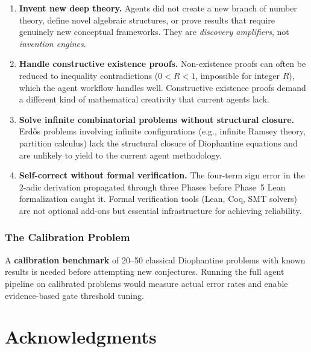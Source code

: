 \documentclass[12pt,a4paper]{article}
\theoremstyle{plain}
\theoremstyle{definition}
\begin{document}
\begin{enumerate}[label=(\arabic*), nosep]
  \item \textbf{Invent new deep theory.}
    Agents did not create a new branch of number theory, define novel
    algebraic structures, or prove results that require genuinely new
    conceptual frameworks.  They are \emph{discovery amplifiers}, not
    \emph{invention engines}.

  \item \textbf{Handle constructive existence proofs.}
    Non-existence proofs can often be reduced to inequality contradictions
    ($0 < R < 1$, impossible for integer $R$), which the agent workflow
    handles well.  Constructive existence proofs demand a different kind of
    mathematical creativity that current agents lack.

  \item \textbf{Solve infinite combinatorial problems without
    structural closure.}
    Erd\H{o}s problems involving infinite configurations (e.g., infinite
    Ramsey theory, partition calculus) lack the structural closure of
    Diophantine equations and are unlikely to yield to the current agent
    methodology.

  \item \textbf{Self-correct without formal verification.}
    The four-term sign error in the $2$-adic derivation propagated
    through three Phases before Phase~5 Lean formalization caught it.
    Formal verification tools (Lean, Coq, SMT solvers) are not optional
    add-ons but essential infrastructure for achieving reliability.
\end{enumerate}

\subsubsection{The Calibration Problem}

A \textbf{calibration benchmark} of 20--50 classical Diophantine
problems with known results is needed before attempting new
conjectures.  Running the full agent pipeline on calibrated problems
would measure actual error rates and enable evidence-based gate
threshold tuning.

\section*{Acknowledgments}
\end{document}
